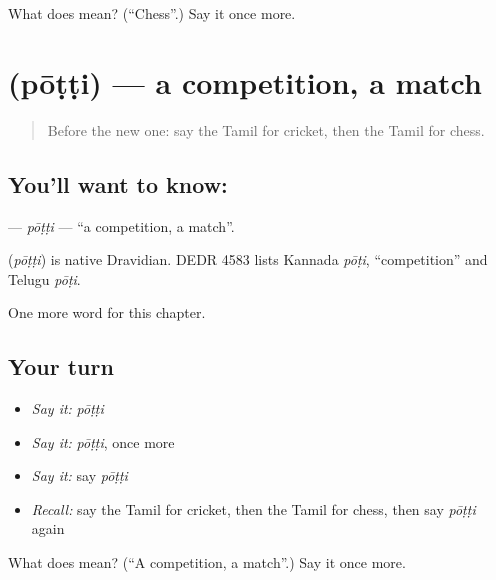 \begin{tcolorbox}[breakable,colback=teal!4,colframe=teal!35!black,title={Before you move on}]
What does  mean? (\textquotedblleft{}Chess\textquotedblright{}.) Say it once more.
\end{tcolorbox}
\section[\texorpdfstring{\ta{போட்டி} (pōṭṭi)}{போட்டி (pōṭṭi)}]{ (pōṭṭi) — a competition, a match}

\label{lesson:TA-C249-potti}



\begin{quote}
Before the new one: say the Tamil for cricket, then the Tamil for chess.
\end{quote}

\subsection*{You'll want to know: }
\textbf{} — \emph{pōṭṭi} — \textquotedblleft{}a competition, a match\textquotedblright{}.

\begin{cousinweb}
\textbf{} (\emph{pōṭṭi}) is native Dravidian. DEDR 4583 lists Kannada \emph{pōṭi}, \textquotedblleft{}competition\textquotedblright{} and Telugu \emph{pōṭi}.
\end{cousinweb}

\begin{grammarlens}[title={What you've built}]
One more word for this chapter.
\end{grammarlens}

\subsection*{Your turn}
\begin{itemize}
\raggedright
  \item \emph{Say it:} \emph{pōṭṭi}
  \item \emph{Say it:} \emph{pōṭṭi}, once more
  \item \emph{Say it:} say \emph{pōṭṭi}
  \item \emph{Recall:} say the Tamil for cricket, then the Tamil for chess, then say \emph{pōṭṭi} again
\end{itemize}

\begin{tcolorbox}[breakable,colback=teal!4,colframe=teal!35!black,title={Before you move on}]
What does  mean? (\textquotedblleft{}A competition, a match\textquotedblright{}.) Say it once more.
\end{tcolorbox}
